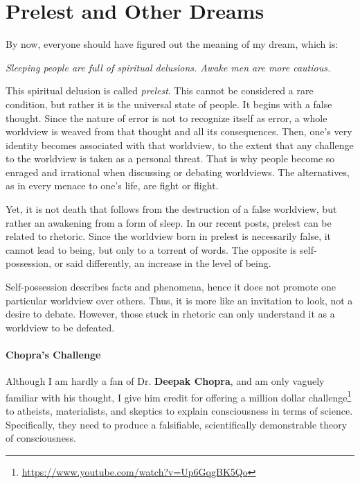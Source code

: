 \section{Prelest and Other Dreams}

By now, everyone should have figured out the meaning of my dream, which is:

\begin{quotex}
\emph{Sleeping people are full of spiritual delusions. Awake men are more cautious.} 

\end{quotex}
This spiritual delusion is called \emph{prelest}. This cannot be considered a rare condition, but rather it is the universal state of people. It begins with a false thought. Since the nature of error is not to recognize itself as error, a whole worldview is weaved from that thought and all its consequences. Then, one's very identity becomes associated with that worldview, to the extent that any challenge to the worldview is taken as a personal threat. That is why people become so enraged and irrational when discussing or debating worldviews. The alternatives, as in every menace to one's life, are fight or flight.

Yet, it is not death that follows from the destruction of a false worldview, but rather an awakening from a form of sleep. In our recent posts, prelest can be related to rhetoric. Since the worldview born in prelest is necessarily false, it cannot lead to being, but only to a torrent of words. The opposite is self-possession, or said differently, an increase in the level of being.

Self-possession describes facts and phenomena, hence it does not promote one particular worldview over others. Thus, it is more like an invitation to look, not a desire to debate. However, those stuck in rhetoric can only understand it as a worldview to be defeated.

\paragraph{Chopra's Challenge}
Although I am hardly a fan of Dr. \textbf{Deepak Chopra}, and am only vaguely familiar with his thought, I give him credit for offering a million dollar challenge\footnote{\url{https://www.youtube.com/watch?v=Up6GqgBK5Qo}} to atheists, materialists, and skeptics to explain consciousness in terms of science. Specifically, they need to produce a falsifiable, scientifically demonstrable theory of consciousness.

